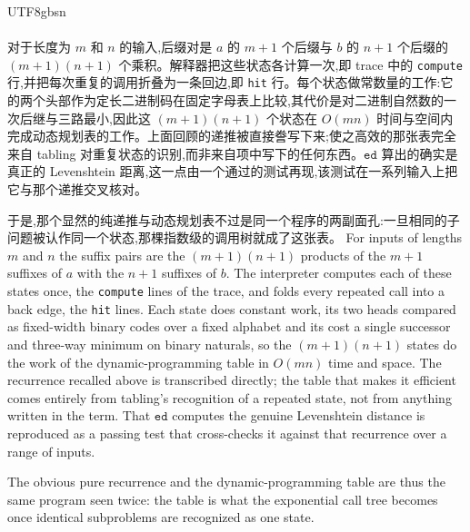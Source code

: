 \begin{CJK*}{UTF8}{gbsn}
  \paragraph{}
  \ifTablambdaChinese
  对于长度为 $m$ 和 $n$ 的输入,后缀对是 $a$ 的 $m{+}1$ 个后缀与 $b$ 的 $n{+}1$ 个后缀的 $(m{+}1)(n{+}1)$ 个乘积。解释器把这些状态各计算一次,即 trace 中的 \texttt{compute} 行,并把每次重复的调用折叠为一条回边,即 \texttt{hit} 行。每个状态做常数量的工作:它的两个头部作为定长二进制码在固定字母表上比较,其代价是对二进制自然数的一次后继与三路最小,因此这 $(m{+}1)(n{+}1)$ 个状态在 $O(mn)$ 时间与空间内完成动态规划表的工作。上面回顾的递推被直接誊写下来;使之高效的那张表完全来自 tabling 对重复状态的识别,而非来自项中写下的任何东西。$\mathtt{ed}$ 算出的确实是真正的 Levenshtein 距离,这一点由一个通过的测试再现,该测试在一系列输入上把它与那个递推交叉核对。

  于是,那个显然的纯递推与动态规划表不过是同一个程序的两副面孔:一旦相同的子问题被认作同一个状态,那棵指数级的调用树就成了这张表。
  \else
  For inputs of lengths $m$ and $n$ the suffix pairs are the $(m{+}1)(n{+}1)$ products of the $m{+}1$ suffixes of $a$ with the $n{+}1$ suffixes of $b$. The interpreter computes each of these states once, the \texttt{compute} lines of the trace, and folds every repeated call into a back edge, the \texttt{hit} lines. Each state does constant work, its two heads compared as fixed-width binary codes over a fixed alphabet and its cost a single successor and three-way minimum on binary naturals, so the $(m{+}1)(n{+}1)$ states do the work of the dynamic-programming table in $O(mn)$ time and space. The recurrence recalled above is transcribed directly; the table that makes it efficient comes entirely from tabling's recognition of a repeated state, not from anything written in the term. That $\mathtt{ed}$ computes the genuine Levenshtein distance is reproduced as a passing test that cross-checks it against that recurrence over a range of inputs.

  The obvious pure recurrence and the dynamic-programming table are thus the same program seen twice: the table is what the exponential call tree becomes once identical subproblems are recognized as one state.
  \fi


\end{CJK*}
